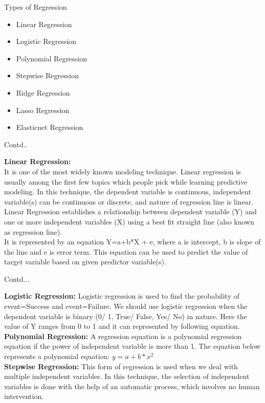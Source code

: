 \documentclass{beamer}
\begin{document}
\begin{frame}{Types of Regression}
	\begin{itemize}
	\item Linear Regression
	\item Logistic Regression
	\item Polynomial Regression
	\item Stepwise Regression
	\item Ridge Regression
	\item Lasso Regression
	\item Elasticnet Regression

\end{itemize}
\end{frame}

\begin{frame}{Contd..}
\begin{flushleft}
	\textbf{Linear Regression:}
\\
\vspace{10pt}
				It is one of the most widely known modeling technique. Linear regression is usually among the first few topics which people pick while learning predictive modeling. In this technique, the dependent variable is continuous, independent variable(s) can be continuous or discrete, and nature of regression line is linear.
\\
\vspace{10pt}	
Linear Regression establishes a relationship between dependent variable (Y) and one or more independent variables (X) using a best fit straight line (also known as regression line).
\\
\vspace{10pt}	
It is represented by an equation Y=a+b*X + e, where a is intercept, b is slope of the line and e is error term. This equation can be used to predict the value of target variable based on given predictor variable(s).	
	\end{flushleft}

\end{frame}

\begin{frame}{Contd...}
\begin{flushleft}
	\textbf{Logistic Regression:}
	Logistic regression is used to find the probability of event=Success and event=Failure. We should use logistic regression when the dependent variable is binary (0/ 1, True/ False, Yes/ No) in nature. Here the value of Y ranges from 0 to 1 and it can represented by following equation.
\\
\vspace{10pt}
\textbf{Polynomial Regression:}
				A regression equation is a polynomial regression equation if the power of independent variable is more than 1. The equation below represents a polynomial equation: $y=a+b*x^2$
\\
\vspace{10pt}			
\textbf{Stepwise Regression:}
				This form of regression is used when we deal with multiple independent variables. In this technique, the selection of independent variables is done with the help of an automatic process, which involves no human intervention.
	\end{flushleft}
\end{frame}
\end{document}
